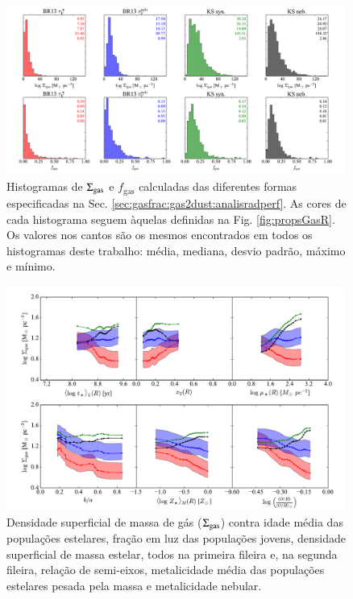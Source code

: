 \begin{figure}
	\centering
	\includegraphics[width=0.99\textwidth]{figuras/histo_gas_R.pdf}
	\caption[Histogramas de $\SigmaGas$ e $f_{\mathrm{gas}}$]
	{Histogramas de $\SigmaGas$ e $f_{\mathrm{gas}}$ calculadas das diferentes formas especificadas
na Sec. \ref{sec:gasfrac:gas2dust:analisradperf}. As cores de cada histograma seguem àquelas
definidas na Fig. \ref{fig:propsGasR}. Os valores nos cantos são os mesmos encontrados em todos os
histogramas deste trabalho: média, mediana, desvio padrão, máximo e mínimo.}
	\label{fig:histoGas}
\end{figure}

\begin{figure}
	\centering
 	\includegraphics[width=0.99\textwidth]{figuras/props_SigmaGas.pdf}
 	\caption[Propriedades físicas e $\SigmaGas$]
 	{Densidade superficial de massa de gás ($\SigmaGas$) contra idade média das populações estelares,
fração em luz das populações jovens, densidade superficial de massa estelar, todos na primeira
fileira e, na segunda fileira, relação de semi-eixos, metalicidade média das populações estelares
pesada pela massa e metalicidade nebular.}
	\label{fig:propsSigmaGas}
\end{figure}

